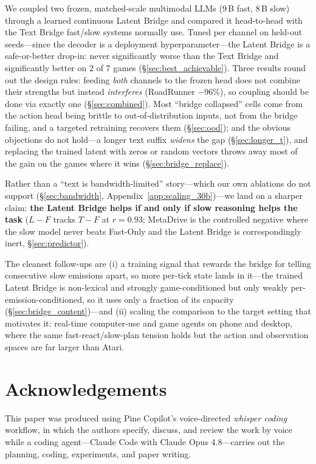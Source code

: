 \documentclass[11pt]{article}
\begin{document}
We coupled two frozen, matched-scale multimodal LLMs (9\,B fast, 8\,B slow) through a learned
continuous Latent Bridge and compared it head-to-head with the Text Bridge fast/slow systems
normally use. Tuned per channel on held-out seeds---since the decoder is a deployment
hyperparameter---the Latent Bridge is a safe-or-better drop-in: never significantly worse than the
Text Bridge and significantly better on 2 of 7 games (\S\ref{sec:best_achievable}). Three results round out the
design rules: feeding \emph{both} channels to the frozen head does not combine their strengths but
instead \emph{interferes} (RoadRunner $-96\%$), so coupling should be done via exactly one (\S\ref{sec:combined}). Most
``bridge collapsed'' cells come from the action head being brittle to out-of-distribution inputs,
not from the bridge failing, and a targeted retraining recovers them (\S\ref{sec:ood}); and the
obvious objections do not hold---a longer text suffix \emph{widens} the gap (\S\ref{sec:longer_t}),
and replacing the trained latent with zeros or random vectors throws away most of the gain on the
games where it wins (\S\ref{sec:bridge_replace}).

Rather than a ``text is bandwidth-limited'' story---which our own ablations do not support
(\S\ref{sec:bandwidth}, Appendix~\ref{app:scaling_30b})---we land on a sharper claim:
\textbf{the Latent Bridge helps if and only if slow reasoning helps the task} ($L\!-\!F$ tracks
$T\!-\!F$ at $r=0.93$; MetaDrive is the controlled negative where the slow model never beats
Fast-Only and the Latent Bridge is correspondingly inert, \S\ref{sec:predictor}).

The cleanest follow-ups are (i) a training signal that rewards the bridge for telling consecutive
slow emissions apart, so more per-tick state lands in it---the trained Latent Bridge is non-lexical
and strongly game-conditioned but only weakly per-emission-conditioned, so it uses only a fraction
of its capacity (\S\ref{sec:bridge_content})---and (ii) scaling the comparison to the
target setting that motivates it: real-time computer-use and game agents on phone and desktop,
where the same fast-react/slow-plan tension holds but the action and observation spaces are far
larger than Atari.

\section*{Acknowledgements}
This paper was produced using Pine Copilot's voice-directed \emph{whisper coding} workflow, in which the authors specify, discuss, and review the work by voice while a coding agent---Claude Code with Claude Opus 4.8---carries out the planning, coding, experiments, and paper writing.
\end{document}
